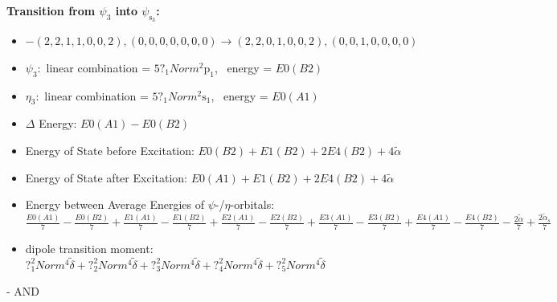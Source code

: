 \documentclass[12pt,a4paper]{article}
\begin{document}
        \noindent\textbf{Transition from $\psi_{3}$ into $\psi_{\text{s}_{3}}$:}
        \begin{itemize}
            \item $- (2, 2, 1, 1, 0, 0, 2), (0, 0, 0, 0, 0, 0, 0) \rightarrow (2, 2, 0, 1, 0, 0, 2), (0, 0, 1, 0, 0, 0, 0)$
        
            \item $\psi_{3}:$ linear combination = $5 ?_{1} Norm^{2} \text{p}_{1}$, \
            energy = $E0(B2)$
            
            \item $\eta_{3}:$ linear combination = $5 ?_{1} Norm^{2} \text{s}_{1}$, \
            energy = $E0(A1)$
            
                \item $\Delta$ Energy: $E0(A1) - E0(B2)$
                \item Energy of State before Excitation: $E0(B2) + E1(B2) + 2 E4(B2) + 4 \tilde{\alpha}$
                \item Energy of State after Excitation: $E0(A1) + E1(B2) + 2 E4(B2) + 4 \tilde{\alpha}$
                \item Energy between Average Energies of $\psi$-/$\eta$-orbitals: $\frac{E0(A1)}{7} - \frac{E0(B2)}{7} + \frac{E1(A1)}{7} - \frac{E1(B2)}{7} + \frac{E2(A1)}{7} - \frac{E2(B2)}{7} + \frac{E3(A1)}{7} - \frac{E3(B2)}{7} + \frac{E4(A1)}{7} - \frac{E4(B2)}{7} - \frac{2 \tilde{\alpha}}{7} + \frac{2 \tilde{\alpha}_{s}}{7}$
            
            \item dipole transition moment: $?_{1}^{2} Norm^{4} \tilde{\delta} + ?_{2}^{2} Norm^{4} \tilde{\delta} + ?_{3}^{2} Norm^{4} \tilde{\delta} + ?_{4}^{2} Norm^{4} \tilde{\delta} + ?_{5}^{2} Norm^{4} \tilde{\delta}$
        
        \end{itemize}
        
 -  AND 
\end{document}
